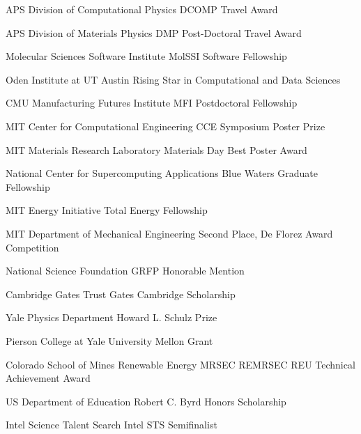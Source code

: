 {APS Division of Computational Physics}
{DCOMP Travel Award}
{}

\datedsubsectionnarrow{}
{APS Division of Materials Physics}
{DMP Post-Doctoral Travel Award}{}

{Molecular Sciences Software Institute}
{MolSSI Software Fellowship}{}

\datedsubsectionnarrow{}
{Oden Institute at UT Austin}
{Rising Star in Computational and Data Sciences}{}

{CMU Manufacturing Futures Institute}
{MFI Postdoctoral Fellowship}{}

\datedsubsectionnarrow{}
{MIT Center for Computational Engineering}
{CCE Symposium Poster Prize}{}

{MIT Materials Research Laboratory}
{Materials Day Best Poster Award}{}

{National Center for Supercomputing Applications}
{Blue Waters Graduate Fellowship}{}

{MIT Energy Initiative}
{Total Energy Fellowship}{}

\datedsubsectionnarrow{}
{MIT Department of Mechanical Engineering}
{Second Place, De Florez Award Competition}{}

{National Science Foundation}
{GRFP Honorable Mention}{}

{Cambridge Gates Trust}
{Gates Cambridge Scholarship}{}

\datedsubsectionnarrow{}
{Yale Physics Department}
{Howard L. Schulz Prize}{}

{Pierson College at Yale University}
{Mellon Grant}{}

\datedsubsectionnarrow{}
{Colorado School of Mines Renewable Energy MRSEC}
{REMRSEC REU Technical Achievement Award}{}

{US Department of Education}
{Robert C. Byrd Honors Scholarship}{}

\datedsubsectionnarrow{}
{Intel Science Talent Search}
{Intel STS Semifinalist}{}
